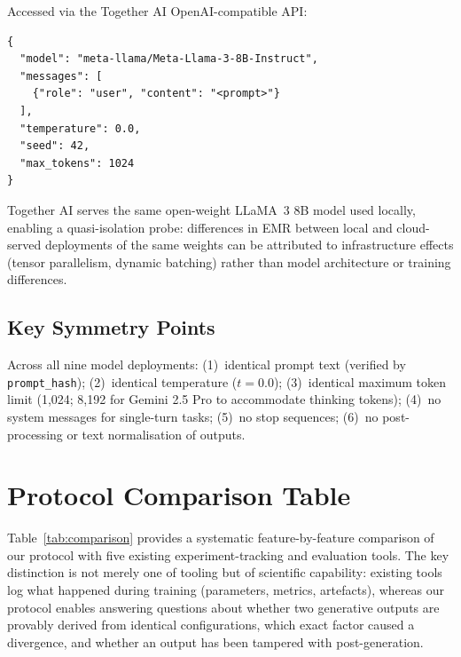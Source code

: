 \documentclass[11pt]{article}
\begin{document}
Accessed via the Together AI OpenAI-compatible API:

\begin{lstlisting}[caption={Together AI API payload.}]
{
  "model": "meta-llama/Meta-Llama-3-8B-Instruct",
  "messages": [
    {"role": "user", "content": "<prompt>"}
  ],
  "temperature": 0.0,
  "seed": 42,
  "max_tokens": 1024
}
\end{lstlisting}

\noindent Together AI serves the same open-weight LLaMA~3 8B model used locally, enabling a quasi-isolation probe: differences in EMR between local and cloud-served deployments of the same weights can be attributed to infrastructure effects (tensor parallelism, dynamic batching) rather than model architecture or training differences.

\subsection{Key Symmetry Points}

Across all nine model deployments: (1)~identical prompt text (verified by \texttt{prompt\_hash}); (2)~identical temperature ($t = 0.0$); (3)~identical maximum token limit (1,024; 8,192 for Gemini 2.5 Pro to accommodate thinking tokens); (4)~no system messages for single-turn tasks; (5)~no stop sequences; (6)~no post-processing or text normalisation of outputs.


\section{Protocol Comparison Table}
\label{sec:s5}

Table~\ref{tab:comparison} provides a systematic feature-by-feature comparison of our protocol with five existing experiment-tracking and evaluation tools. The key distinction is not merely one of tooling but of scientific capability: existing tools log what happened during training (parameters, metrics, artefacts), whereas our protocol enables answering questions about whether two generative outputs are provably derived from identical configurations, which exact factor caused a divergence, and whether an output has been tampered with post-generation.
\end{document}
